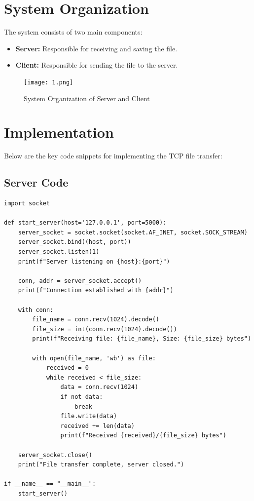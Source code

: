 \documentclass[a4paper, 12pt]{article}
\begin{document}
\section{System Organization}
The system consists of two main components:
\begin{itemize}
    \item \textbf{Server:} Responsible for receiving and saving the file.
    \item \textbf{Client:} Responsible for sending the file to the server.
\end{itemize}

\begin{figure}[h]
    \centering
    \texttt{[image: 1.png]}
    \caption{System Organization of Server and Client}
    \label{fig:architecture}
\end{figure}

\section{Implementation}
Below are the key code snippets for implementing the TCP file transfer:

\subsection{Server Code}
\begin{lstlisting}[caption=Server Code]
import socket

def start_server(host='127.0.0.1', port=5000):
    server_socket = socket.socket(socket.AF_INET, socket.SOCK_STREAM)
    server_socket.bind((host, port))
    server_socket.listen(1)
    print(f"Server listening on {host}:{port}")

    conn, addr = server_socket.accept()
    print(f"Connection established with {addr}")

    with conn:
        file_name = conn.recv(1024).decode()
        file_size = int(conn.recv(1024).decode())
        print(f"Receiving file: {file_name}, Size: {file_size} bytes")

        with open(file_name, 'wb') as file:
            received = 0
            while received < file_size:
                data = conn.recv(1024)
                if not data:
                    break
                file.write(data)
                received += len(data)
                print(f"Received {received}/{file_size} bytes")
    
    server_socket.close()
    print("File transfer complete, server closed.")

if __name__ == "__main__":
    start_server()
\end{lstlisting}
\end{document}
